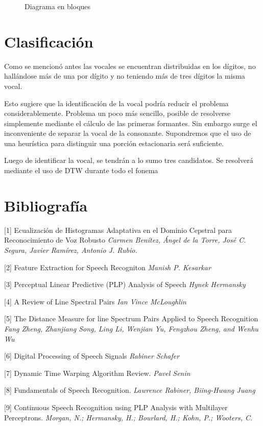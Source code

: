 \documentclass[a4paper]{article}
\begin{document}
		\begin{figure}
			\fbox{
				
			}
			\caption{Diagrama en bloques}
		\end{figure}

	\section{Clasificación}
		Como se mencionó antes las vocales se encuentran
		distribuidas en los dígitos, no hallándose más de
		una por dígito y no teniendo más de tres dígitos la
		misma vocal.

		Esto sugiere que la identificación de la vocal podría
		reducir el problema considerablemente.	Problema un poco
		más sencillo, posible de resolverse simplemente mediante
		el cálculo de las primeras formantes.	Sin embargo surge
		el inconveniente de separar la vocal de la consonante.
		Supondremos que el uso de una heurística para distinguir
		una porción estacionaria será suficiente.

		Luego de identificar la vocal, se tendrán a lo sumo
		tres candidatos.  Se resolverá mediante el uso de DTW
		durante todo el fonema


	\section{Bibliografía}
		[1] Ecualización de Histogramas Adaptativa en
		el Dominio Cepstral para Reconocimiento de Voz Robusto
		\emph{Carmen Benítez, Ángel de la Torre, José C. Segura, Javier Ramírez, Antonio J. Rubio.}


		[2] Feature Extraction for Speech Recogniton
		\emph{Manish P. Kesarkar}


		[3] Perceptual Linear Predictive (PLP) Analysis of Speech
		\emph{Hynek Hermansky}


		[4] A Review of Line Spectral Pairs
		\emph{Ian Vince McLoughlin}


		[5] The Distance Measure for line Spectrum Pairs
		Applied to Speech Recognition
		\emph{Fang Zheng, Zhanjiang Song, Ling Li, Wenjian Yu, Fengzhou Zheng, and Wenhu Wu}


		[6] Digital Processing of Speech Signals
		\emph{Rabiner Schafer}


		[7] Dynamic Time Warping Algorithm Review.
		\emph{Pavel Senin}


		[8] Fundamentals of Speech Recognition.
		\emph{Lawrence Rabiner, Biing-Hwang Juang}

		[9] Continuous Speech Recognition using PLP Analysis with Multilayer Perceptrons.
		\emph{Morgan, N.; Hermansky, H.; Bourlard, H.; Kohn, P.; Wooters, C.}
		
	
\end{document}
